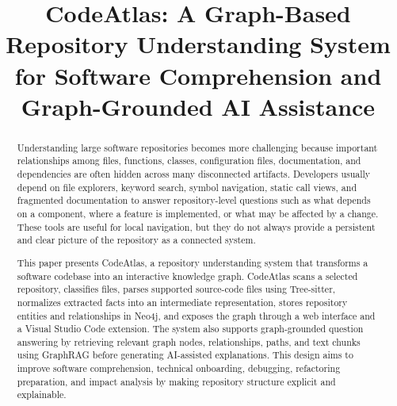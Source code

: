 \documentclass[conference]{IEEEtran}
\begin{document}
\setlength{\marginparwidth}{2cm}

\title{CodeAtlas: A Graph-Based Repository Understanding System for Software Comprehension and Graph-Grounded AI Assistance}

\author{
}
\maketitle

\begin{abstract}
Understanding large software repositories becomes more challenging because important relationships among files, functions, classes, configuration files, documentation, and dependencies are often hidden across many disconnected artifacts. Developers usually depend on file explorers, keyword search, symbol navigation, static call views, and fragmented documentation to answer repository-level questions such as what depends on a component, where a feature is implemented, or what may be affected by a change. These tools are useful for local navigation, but they do not always provide a persistent and clear picture of the repository as a connected system.

This paper presents CodeAtlas, a repository understanding system that transforms a software codebase into an interactive knowledge graph. CodeAtlas scans a selected repository, classifies files, parses supported source-code files using Tree-sitter, normalizes extracted facts into an intermediate representation, stores repository entities and relationships in Neo4j, and exposes the graph through a web interface and a Visual Studio Code extension. The system also supports graph-grounded question answering by retrieving relevant graph nodes, relationships, paths, and text chunks using GraphRAG before generating AI-assisted explanations. This design aims to improve software comprehension, technical onboarding, debugging, refactoring preparation, and impact analysis by making repository structure explicit and explainable.
\end{abstract}
\end{document}
